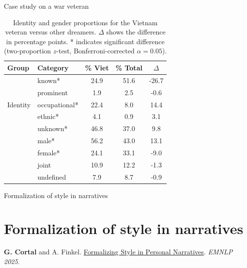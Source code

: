 \documentclass[handout,10pt]{beamer}
\begin{document}
\begin{frame}{Case study on a war veteran}
  \begin{table}
    \centering
    \begin{tabular}{llccc}
\textbf{Group} & \textbf{Category} & \textbf{\% Viet} & \textbf{\% Total} & \textbf{$\Delta$} \\
\midrule
\multirow{5}{*}{Identity} & known* & 24.9 & 51.6 & -26.7 \\
& prominent & 1.9 & 2.5 & -0.6 \\
& occupational* & 22.4 & 8.0 & 14.4 \\
& ethnic* & 4.1 & 0.9 & 3.1 \\
& unknown* & 46.8 & 37.0 & 9.8 \\
\addlinespace
\multirow{4}{*}{Gender} & male* & 56.2 & 43.0 & 13.1 \\
& female* & 24.1 & 33.1 & -9.0 \\
& joint & 10.9 & 12.2 & -1.3 \\
& undefined & 7.9 & 8.7 & -0.9 \\
\end{tabular}
\caption{Identity and gender proportions for the Vietnam veteran versus other dreamers. $\Delta$ shows the difference in percentage points. * indicates significant difference (two-proportion $z$-test, Bonferroni-corrected $\alpha=0.05$).}
\label{tab:case_study_war_veteran}
\end{table}
\end{frame}


\begin{frame}{}
\Large
\begin{center}
    Formalization of style in narratives
    \section{Formalization of style in narratives}
\end{center}

\vspace{1.5cm}

\footnotesize

\textbf{G. Cortal} and A. Finkel. \href{https://gustavecortal.com/data/Formalizing_Style_in_Personal_Narratives.pdf}{Formalizing Style in Personal Narratives}. \textit{EMNLP 2025}.
\end{frame}
\end{document}
